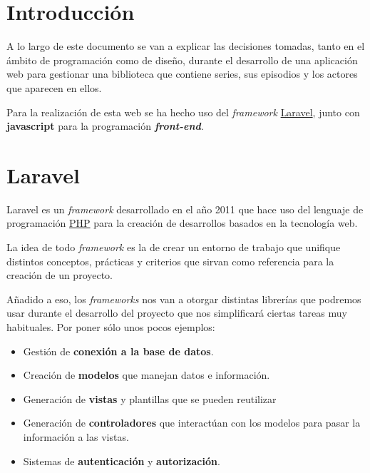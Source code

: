 \documentclass{\ClassPath/viu-tfm-template}
\begin{document}
\graphicspath{{../../VIU_TFM_LaTeX_template/}}

\coverpage

\tableofcontents

\chapter{Introducción}

A lo largo de este documento se van a explicar las decisiones tomadas, tanto en el ámbito de programación como de diseño, durante el desarrollo de una aplicación web para gestionar una biblioteca que contiene series, sus episodios y los actores que aparecen en ellos.

Para la realización de esta web se ha hecho uso del \textit{framework} \href{https://laravel.com/}{Laravel}, junto con \textbf{javascript} para la programación \textbf{\textit{front-end}}.


\chapter{Laravel}

Laravel es un \textit{framework} desarrollado en el año 2011 que hace uso del lenguaje de programación \href{https://www.php.net/}{PHP} para la creación de desarrollos basados en la tecnología web.

La idea de todo \textit{framework} es la de crear un entorno de trabajo que unifique distintos conceptos, prácticas y criterios que sirvan como referencia para la creación de un proyecto.

Añadido a eso, los \textit{frameworks} nos van a otorgar distintas librerías que podremos usar durante el desarrollo del proyecto que nos simplificará ciertas tareas muy habituales. Por poner sólo unos pocos ejemplos:

\vspace{-1em}
\begin{itemize}
    \item Gestión de \textbf{conexión a la base de datos}.
    \item Creación de \textbf{modelos} que manejan datos e información.
    \item Generación de \textbf{vistas} y plantillas que se pueden reutilizar
    \item Generación de \textbf{controladores} que interactúan con los modelos para pasar la información a las vistas.
    \item Sistemas de \textbf{autenticación} y \textbf{autorización}.
\end{itemize}
\vspace{-1em}
\end{document}
